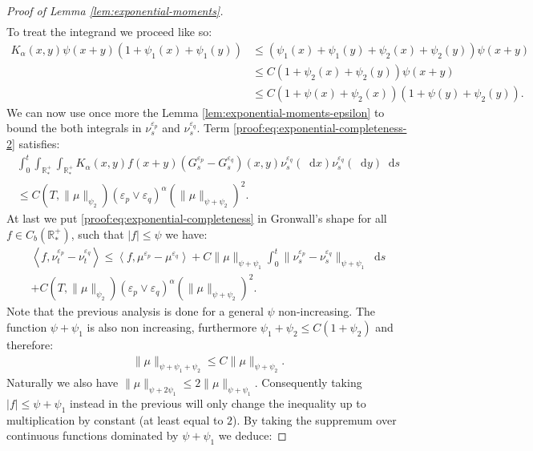 \documentclass[11pt,a4paper]{article}
\newcommand{\RRP}{\mathbb{R}^+_*}
\newcommand{\brac}[1]{\left\langle#1\right\rangle}
\newcommand{\dd}{\mathop{}\!\mathrm{d}}
\begin{document}
\begin{proof}[Proof of Lemma \ref{lem:exponential-moments}]
\begin{multline*}
    \end{multline*}
    To treat the integrand we proceed like so:
    \begin{align*}
        K_\alpha(x,y)\psi(x+y)\left(1 + \psi_1(x) + \psi_1(y) \right) 
        &\leq \left(\psi_1(x) + \psi_1(y) + \psi_2(x) + \psi_2(y)\right)\psi(x+y) \\
        &\leq C\left(1 + \psi_2(x) + \psi_2(y)\right)\psi(x+y) \\
        &\leq C\left(1 + \psi(x) + \psi_2(x)\right)\left(1 + \psi(y)+ \psi_2(y)\right).
    \end{align*}
    We can now use once more the Lemma \ref{lem:exponential-moments-epsilon} to bound the both integrals in $ \nu_s^{\varepsilon_p}$ and $\nu_s^{\varepsilon_q}$. Term \eqref{proof:eq:exponential-completeness-2} satisfies:
    \begin{align*}
        \int_0^t\int_{\RRP}\int_{\RRP}K_\alpha(x,y)f(x+y) (G^{\varepsilon_p}_s - G^{\varepsilon_q}_s)(x,y)\nu_s^{\varepsilon_q}(\dd x)\nu_s^{\varepsilon_q}(\dd y) \dd s \\
        \leq C\left(T,\|\mu\|_{\psi_2}\right)\left(\varepsilon_p \vee \varepsilon_q \right)^{\alpha} \left(\|\mu\|_{\psi + \psi_2}\right)^2.
    \end{align*}
    At last we put \eqref{proof:eq:exponential-completeness} in Gronwall's shape for all $f \in C_b(\RRP)$, such that  $|f| \leq \psi$ we have:
    \begin{multline*}
        \brac{f,\nu_t^{\varepsilon_p}-\nu_t^{\varepsilon_q}} \leq  \brac{f,\mu^{\varepsilon_p} - \mu^{\varepsilon_q}} + C\|\mu\|_{\psi + \psi_1}\int_0^t \|\nu_s^{\varepsilon_p}-\nu_s^{\varepsilon_q}\|_{\psi + \psi_1}\dd s \\
        + C\left(T,\|\mu\|_{\psi_2}\right)\left(\varepsilon_p \vee \varepsilon_q \right)^{\alpha} \left(\|\mu\|_{\psi + \psi_2}\right)^2.
    \end{multline*}
    Note that the previous analysis is done for a general $\psi$ non-increasing. The function $\psi + \psi_1$ is also non increasing, furthermore $\psi_1 + \psi_2 \leq C(1 + \psi_2)$ and therefore:
    \begin{align*}
        \|\mu\|_{\psi + \psi_1 + \psi_2} \leq C\|\mu\|_{\psi + \psi_2}.
    \end{align*}
    Naturally we also have $\|\mu\|_{\psi + 2\psi_1} \leq 2 \|\mu\|_{\psi + \psi_1}$. Consequently taking $|f| \leq \psi + \psi_1$ instead in the previous will only change the inequality up to multiplication by constant (at least equal to $2$). By taking the suppremum over continuous functions dominated by $\psi + \psi_1$ we deduce:

\end{proof}
\end{document}
